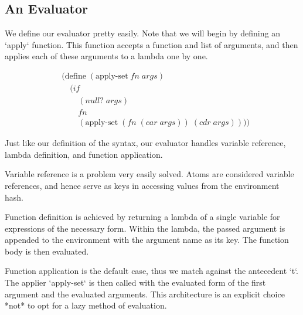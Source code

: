 \subsection{An Evaluator}
We define our evaluator pretty easily. Note that we will begin by defining an 
`apply` function. This function accepts a function and list of arguments, and 
then applies each of these arguments to a lambda one by one.

\begin{align*}
& (\text{define} \; (\text{apply-set} \; fn \; args)
\\& \quad (if
\\& \qquad (null? \; args)
\\& \qquad fn
\\& \qquad (\text{apply-set} \; (fn \; (car \; args)) \; (cdr \; args))))
\end{align*}

Just like our definition of the syntax, our evaluator handles variable reference, 
lambda definition, and function application. 

Variable reference is a problem very easily solved. Atoms are considered 
variable references, and hence serve as keys in accessing values from the 
environment hash.

Function definition is achieved by returning a lambda of a single variable for 
expressions of the necessary form. Within the lambda, the passed argument is 
appended to the environment with the argument name as its key. The function body 
is then evaluated.

Function application is the default case, thus we match against the antecedent 
`t`. The applier `apply-set` is then called with the evaluated form of the first 
argument and the evaluated arguments. This architecture is an explicit choice 
*not* to opt for a lazy method of evaluation.

